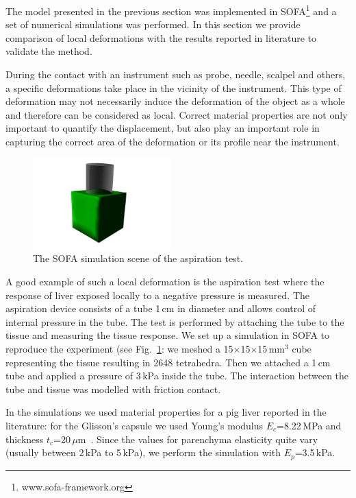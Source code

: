 \documentclass{acm_proc_article-sp}
\begin{document}
The model presented in the previous section was implemented in 
SOFA\footnote{www.sofa-framework.org} and a set of
numerical simulations was performed.
In this section we provide comparison of local deformations with the
results reported in literature to validate the method.

During the contact with an instrument such as probe, needle, scalpel and others,
a specific deformations take place in the vicinity of
the instrument. This type of deformation may not necessarily induce the
deformation of the object as a whole and therefore can be considered as
local. Correct material properties are not only important to quantify the
displacement, but also play an important role in capturing the correct area of
the deformation or its profile near the instrument.

\begin{figure}
  \centering
  \includegraphics[height=3.5cm]{aspiration.jpg}
  \caption{\label{fig-aspiration1} The SOFA simulation scene of the aspiration test.}
\end{figure}

A good example of such a local deformation is the aspiration test
where the response of liver exposed locally to a negative pressure is measured.
The aspiration device consists of a tube 1\,cm in diameter and allows
control of internal pressure in the tube. The test is performed by
attaching the tube to the tissue and measuring the tissue response. We
set up a simulation in SOFA to reproduce the experiment (see
Fig.~\ref{fig-aspiration1}: we meshed a 15$\times$15$\times$15\,mm$^3$ 
cube representing the tissue 
resulting in 2648 tetrahedra. Then we attached a 1\,cm tube 
and applied a pressure of 3\,kPa inside the tube. The interaction between the tube and 
tissue was modelled with friction contact. 

In the simulations we used material properties for a pig liver reported in the literature: for the 
Glisson's capsule we used Young's modulus $E_c$=8.22\,MPa and thickness $t_c$=20\,$\mu$m~\cite{Umale2011}.
Since the values for parenchyma elasticity quite vary (usually between 2\,kPa to 5\,kPa), we perform the simulation 
with $E_p$=3.5\,kPa.
\end{document}
